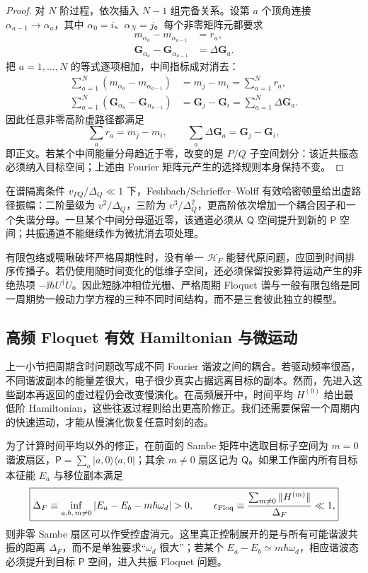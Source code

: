 \begin{proof}
对 $N$ 阶过程，依次插入 $N-1$ 组完备关系。设第 $a$ 个顶角连接 $\alpha_{a-1}\to\alpha_a$，其中 $\alpha_0=i$、$\alpha_N=j$。每个非零矩阵元都要求
\begin{align*}
m_{\alpha_a}-m_{\alpha_{a-1}}&=r_a,\\
\mathbf G_{\alpha_a}-\mathbf G_{\alpha_{a-1}}
&=\Delta\mathbf G_a.
\end{align*}
把 $a=1,\ldots,N$ 的等式逐项相加，中间指标成对消去：
\begin{align*}
\sum_{a=1}^{N}
(m_{\alpha_a}-m_{\alpha_{a-1}})
&=m_j-m_i
=\sum_{a=1}^{N}r_a,\\
\sum_{a=1}^{N}
(\mathbf G_{\alpha_a}-\mathbf G_{\alpha_{a-1}})
&=\mathbf G_j-\mathbf G_i
=\sum_{a=1}^{N}\Delta\mathbf G_a.
\end{align*}
因此任意非零高阶虚路径都满足
\[
\boxed{
\sum_a r_a=m_j-m_i,
\qquad
\sum_a\Delta\mathbf G_a=\mathbf G_j-\mathbf G_i,}
\]
即正文。若某个中间能量分母趋近于零，改变的是 $P/Q$ 子空间划分：该近共振态必须纳入目标空间；上述由 Fourier 矩阵元产生的选择规则本身保持不变。
\end{proof}


在谱隔离条件 $v_{PQ}/\Delta_Q\ll1$ 下，Feshbach/Schrieffer--Wolff 有效哈密顿量给出虚路径振幅：二阶量级为 $v^2/\Delta_Q$，三阶为 $v^3/\Delta_Q^2$，更高阶依次增加一个耦合因子和一个失谐分母。一旦某个中间分母逼近零，该通道必须从 $\mathsf Q$ 空间提升到新的 $\mathsf P$ 空间；共振通道不能继续作为微扰消去项处理。

有限包络或啁啾破坏严格周期性时，没有单一 $\mathcal H_F$ 能替代原问题，应回到时间排序传播子。若仍使用随时间变化的低维子空间，还必须保留投影算符运动产生的非绝热项 $-\ii\hbar U^\dagger\dot U$。因此短脉冲相位光栅、严格周期 Floquet 谱与一般有限包络是同一周期势一般动力学方程的三种不同时间结构，而不是三套彼此独立的模型。

\subsection{高频 Floquet 有效 Hamiltonian 与微运动}

上一小节把周期含时问题改写成不同 Fourier 谐波之间的耦合。若驱动频率很高，不同谐波副本的能量差很大，电子很少真实占据远离目标的副本。然而，先进入这些副本再返回的虚过程仍会改变慢演化。在高频展开中，时间平均 $H^{(0)}$ 给出最低阶 Hamiltonian，这些往返过程则给出更高阶修正。我们还需要保留一个周期内的快速运动，才能从慢演化恢复任意时刻的态。

为了计算时间平均以外的修正，在前面的 Sambe 矩阵中选取目标子空间为 $m=0$ 谐波扇区，$\mathsf P=\sum_a|a,0\rangle\langle a,0|$；其余 $m\neq0$ 扇区记为 $\mathsf Q$。如果工作窗内所有目标本征能 $E_a$ 与移位副本满足
\begin{equation}
\boxed{
\Delta_F
\equiv
\inf_{a,b,\,m\neq0}
|E_a-E_b-m\hbar\omega_d|>0,
\qquad
\epsilon_{\rm Floq}
\equiv
\frac{\sum_{m\neq0}\|H^{(m)}\|}{\Delta_F}\ll1,}
\label{eq:floquet_high_frequency_gap_control}
\end{equation}
则非零 Sambe 扇区可以作受控虚消元。这里真正控制展开的是与所有可能谐波共振的距离 $\Delta_F$，而不是单独要求“$\omega_d$ 很大”；若某个 $E_a-E_b\simeq m\hbar\omega_d$，相应谐波态必须提升到目标 $\mathsf P$ 空间，进入共振 Floquet 问题。

